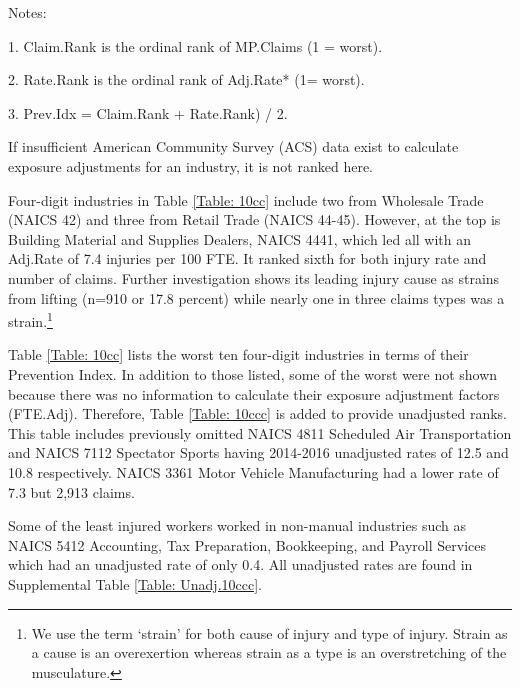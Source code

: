 \documentclass[9pt, oneside]{article}   	%
\begin{document}
    \begin{tablenotes}
      \small
      Notes:
      \\
            \item 1. Claim.Rank is the ordinal rank of MP.Claims (1 = worst). \\
            \item 2. Rate.Rank is the ordinal rank of Adj.Rate* (1= worst). \\
            \item 3. Prev.Idx = Claim.Rank + Rate.Rank) / 2. \\
            \item *If insufficient American Community Survey (ACS) data exist to calculate exposure adjustments for an industry, it is not ranked here.   
    \end{tablenotes}
    
\hspace{0.5in}

\pagebreak
    
Four-digit industries in Table \ref{Table: 10cc} include two from Wholesale Trade (NAICS 42) and three from Retail Trade (NAICS 44-45).  However, at the top is Building Material and Supplies Dealers,  NAICS 4441, which led all with an Adj.Rate of 7.4 injuries per 100 FTE. It ranked sixth for both injury rate and number of claims. Further investigation shows its leading injury cause as strains from lifting (n=910 or 17.8 percent) while nearly one in three claims types was a strain.\footnote{We use the term `strain' for both cause of injury and type of injury. Strain as a cause is an overexertion whereas strain as a type is an overstretching of the musculature.}

Table \ref{Table: 10cc} lists the worst ten four-digit industries in terms of their Prevention Index. In addition to those listed, some of the worst were not shown because there was no information to calculate their exposure adjustment factors (FTE.Adj). Therefore, Table \ref{Table: 10ccc} is added to provide unadjusted ranks. This table includes previously omitted NAICS 4811 Scheduled Air Transportation and NAICS 7112 Spectator Sports having 2014-2016 unadjusted rates of 12.5 and 10.8 respectively. NAICS 3361 Motor Vehicle Manufacturing had a lower rate of 7.3 but 2,913 claims.

Some of the least injured workers worked in non-manual industries such as NAICS 5412 Accounting, Tax Preparation, Bookkeeping, and Payroll Services which had an unadjusted rate of only 0.4. All unadjusted rates are found in Supplemental Table \ref{Table: Unadj.10ccc}.
\end{document}
